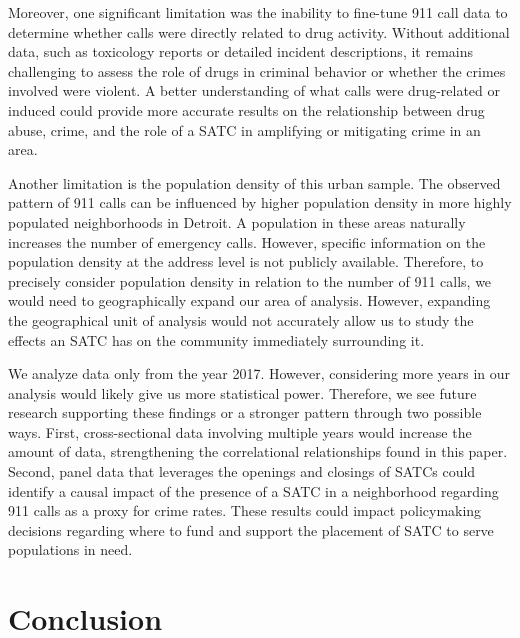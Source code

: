 \documentclass[12pt]{article}
\begin{document}
Moreover, one significant limitation was the inability to fine-tune 911 call data to determine whether calls were directly related to drug activity. Without additional data, such as toxicology reports or detailed incident descriptions, it remains challenging to assess the role of drugs in criminal behavior or whether the crimes involved were violent. A better understanding of what calls were drug-related or induced could provide more accurate results on the relationship between drug abuse, crime, and the role of a SATC in amplifying or mitigating crime in an area. 
    
Another limitation is the population density of this urban sample. The observed pattern of 911 calls can be influenced by higher population density in more highly populated neighborhoods in Detroit. A population in these areas naturally increases the number of emergency calls. However, specific information on the population density at the address level is not publicly available. Therefore, to precisely consider population density in relation to the number of 911 calls, we would need to geographically expand our area of analysis. However, expanding the geographical unit of analysis would not accurately allow us to study the effects an SATC has on the community immediately surrounding it. 

We analyze data only from the year 2017. However, considering more years in our analysis would likely give us more statistical power. Therefore, we see future research supporting these findings or a stronger pattern through two possible ways. First, cross-sectional data involving multiple years would increase the amount of data, strengthening the correlational relationships found in this paper. Second, panel data that leverages the openings and closings of SATCs could identify a causal impact of the presence of a SATC in a neighborhood regarding 911 calls as a proxy for crime rates. These results could impact policymaking decisions regarding where to fund and support the placement of SATC to serve populations in need. 



\section{Conclusion}
\label{sec:conclusion}
\end{document}
